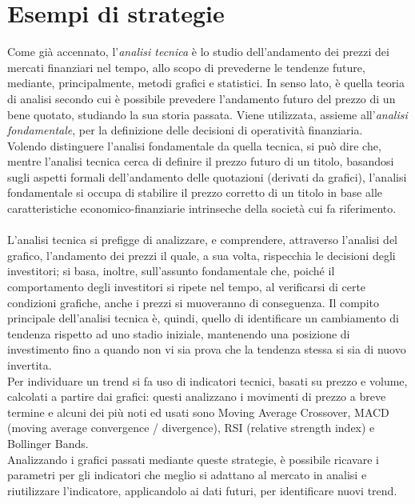 \documentclass[a4paper,12pt]{report}
\begin{document}
\section{Esempi di strategie}
Come già accennato, l'\textit{analisi tecnica} è lo studio dell'andamento dei prezzi dei mercati finanziari nel tempo, allo scopo di prevederne le tendenze future, mediante, principalmente, metodi grafici e statistici. In senso lato, è quella teoria di analisi secondo cui è possibile prevedere l'andamento futuro del prezzo di un bene quotato, studiando la sua storia passata. Viene utilizzata, assieme all'\textit{analisi fondamentale}, per la definizione delle decisioni di operatività finanziaria.\\ Volendo distinguere l'analisi fondamentale da quella tecnica, si può dire che, mentre l'analisi tecnica cerca di definire il prezzo futuro di un titolo, basandosi sugli aspetti formali dell'andamento delle quotazioni (derivati da grafici), l'analisi fondamentale si occupa di stabilire il prezzo corretto di un titolo in base alle caratteristiche economico-finanziarie intrinseche della società cui fa riferimento.\\~\\L'analisi tecnica si prefigge di analizzare, e comprendere, attraverso l'analisi del grafico, l'andamento dei prezzi il quale, a sua volta, rispecchia le decisioni degli investitori;  si basa, inoltre, sull'assunto fondamentale che, poiché il comportamento degli investitori si ripete nel tempo, al verificarsi di certe condizioni grafiche, anche i prezzi si muoveranno di conseguenza. Il compito principale dell'analisi tecnica è, quindi, quello di identificare un cambiamento di tendenza rispetto ad uno stadio iniziale, mantenendo una posizione di investimento fino a quando non vi sia prova che la tendenza stessa si sia di nuovo invertita.\\
Per individuare un trend si fa uso di indicatori tecnici, basati su prezzo e volume, calcolati a partire dai grafici: questi analizzano i movimenti di prezzo a breve termine e alcuni dei più noti ed usati sono Moving Average Crossover, MACD (moving average convergence / divergence), RSI (relative strength index) e Bollinger Bands.\\
Analizzando i grafici passati mediante queste strategie, è possibile ricavare i parametri per gli indicatori che meglio si adattano al mercato in analisi e riutilizzare l'indicatore, applicandolo ai dati futuri, per identificare nuovi trend.\\~\\
\end{document}
